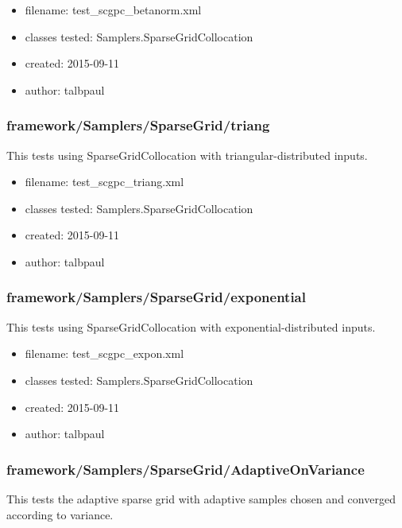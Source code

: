       \begin{itemize}
          \item filename: test\_scgpc\_betanorm.xml
          \item classes tested: Samplers.SparseGridCollocation
          \item created: 2015-09-11
          \item author: talbpaul
      \end{itemize}
    \subsubsection{framework/Samplers/SparseGrid/triang}
      
      This tests using SparseGridCollocation with triangular-distributed inputs.
    
      \begin{itemize}
          \item filename: test\_scgpc\_triang.xml
          \item classes tested: Samplers.SparseGridCollocation
          \item created: 2015-09-11
          \item author: talbpaul
      \end{itemize}
    \subsubsection{framework/Samplers/SparseGrid/exponential}
      
      This tests using SparseGridCollocation with exponential-distributed inputs.
    
      \begin{itemize}
          \item filename: test\_scgpc\_expon.xml
          \item classes tested: Samplers.SparseGridCollocation
          \item created: 2015-09-11
          \item author: talbpaul
      \end{itemize}
    \subsubsection{framework/Samplers/SparseGrid/AdaptiveOnVariance}
      
      This tests the adaptive sparse grid with adaptive samples chosen and converged according to variance.
    
